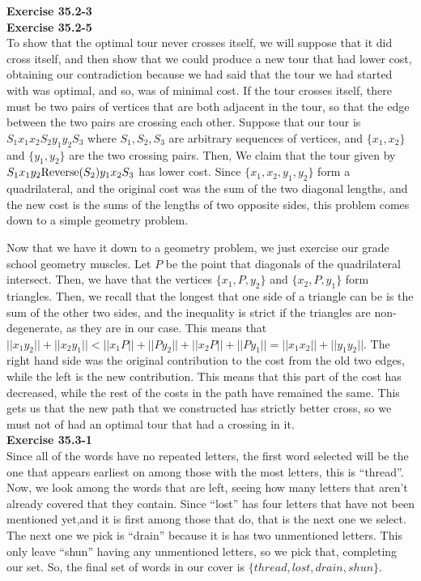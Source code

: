 \documentclass{article}
\begin{document}
\noindent\textbf{Exercise 35.2-3}\\





\noindent\textbf{Exercise 35.2-5}\\

To show that the optimal tour never crosses itself, we will suppose that it did cross itself, and then show that we could produce a new tour that had lower cost, obtaining our contradiction because we had said that the tour we had started with was optimal, and so, was of minimal cost. If the tour crosses itself, there must be two pairs of vertices that are both adjacent in the tour, so that the edge between the two pairs are crossing each other. Suppose that our tour is $S_1x_1 x_2 S_2 y_1 y_2 S_3$ where $S_1,S_2,S_3$ are arbitrary sequences of vertices, and $\{x_1,x_2\}$ and $\{y_1,y_2\}$ are the two crossing pairs. Then, We claim that the tour given by $S_1 x_1 y_2 \hbox{Reverse}(S_2) y_1 x_2 S_3$ has lower cost. Since $\{x_1,x_2,y_1,y_2\}$ form a quadrilateral, and the original cost was the sum of the two diagonal lengths, and the new cost is the sums of the lengths of two opposite sides, this problem comes down to a simple geometry problem.

Now that we have it down to a geometry problem, we just exercise our grade school geometry muscles. Let $P$ be the point that diagonals of the quadrilateral intersect. Then, we have that the vertices $\{x_1,P,y_2\}$ and $\{x_2,P,y_1\}$ form triangles. Then, we recall that the longest that one side of a triangle can be is the sum of the other two sides, and the inequality is strict if the triangles are non-degenerate, as  they are in our case. This means that $||x_1y_2|| + ||x_2y_1|| < ||x_1P|| +||Py_2|| + ||x_2P|| + ||Py_1|| = ||x_1x_2|| + ||y_1y_2||$. The right hand side was the original contribution to the cost from the old two edges, while the left is the new contribution. This means that this part of the cost has decreased, while the rest of the costs in the path have remained the same. This gets us that the new path that we constructed has strictly better cross, so we must not of had an optimal tour that had a crossing in it.\\



\noindent\textbf{Exercise 35.3-1}\\

Since all of the words have no repeated letters, the first word selected will be the one that appears earliest on among those with the most letters, this is ``thread''. Now, we look among the words that are left, seeing how many letters that aren't already covered that they contain. Since ``lost'' has four letters that have not been mentioned yet,and it is first among those that do, that is the next one we select. The next one we pick is ``drain'' because it is has two unmentioned letters. This only leave ``shun'' having any unmentioned letters, so we pick that, completing our set. So, the final set of words in our cover is $\{thread,lost,drain,shun\}$.\\
\end{document}
